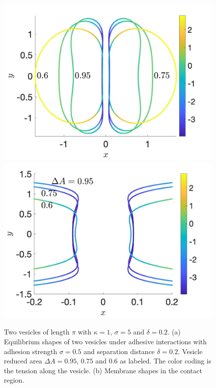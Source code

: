 \documentclass[aps,prl,twocolumn,showpacs,amsmath,amssymb]{revtex4-1}
\begin{document}
\begin{figure}
\includegraphics[keepaspectratio=true,scale=0.175]{figs/Dec18_vesicle_shape_vs_rA_00.jpeg}
\includegraphics[keepaspectratio=true,scale=0.175]{figs/Dec18_vesicle_shape_vs_rA_01.jpeg}
\caption{Two vesicles of length $\pi$ with $\kappa=1$, $\sigma=5$ and $\delta=0.2$.
(a) Equilibrium shapes of two vesicles under adhesive  interactions with adhesion strength $\sigma=0.5$ and separation distance $\delta=0.2$. 
Vesicle reduced area $\Delta A=0.95$, $0.75$ and $0.6$ as labeled.
 The color coding is the tension along the vesicle. (b) Membrane shapes in the contact region.}
\label{fig:Dec18_vesicle_shape}
\end{figure}
\end{document}
